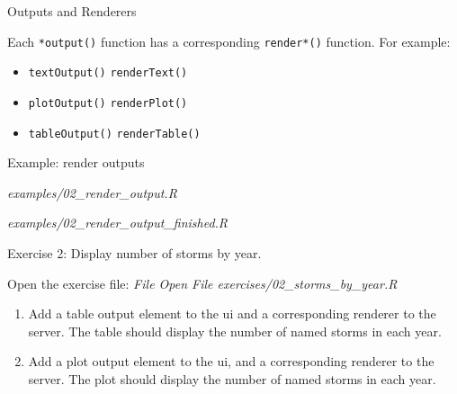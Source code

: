\documentclass[
  12pt,
  ignorenonframetext,
]{beamer}
\providecommand{\tightlist}{%
  \setlength{\itemsep}{0pt}\setlength{\parskip}{0pt}}
\begin{document}
\begin{frame}[fragile]{Outputs and Renderers}
\protect\hypertarget{outputs-and-renderers-1}{}

Each \texttt{*output()} function has a corresponding \texttt{render*()}
function. For example:

\begin{itemize}[<+->]
\tightlist
\item
  \texttt{textOutput()} \rightarrow \texttt{renderText()}
\end{itemize}

\begin{itemize}[<+->]
\tightlist
\item
  \texttt{plotOutput()} \rightarrow \texttt{renderPlot()}
\end{itemize}

\begin{itemize}[<+->]
\tightlist
\item
  \texttt{tableOutput()} \rightarrow \texttt{renderTable()}
\end{itemize}

\end{frame}

\begin{frame}{Example: render outputs}
\protect\hypertarget{example-render-outputs}{}

\begin{description}
\tightlist
\item[Start]
\emph{examples/02\_render\_output.R}
\item[Finished]
\emph{examples/02\_render\_output\_finished.R}
\end{description}

\end{frame}

\begin{frame}{Exercise 2: Display number of storms by year.}
\protect\hypertarget{exercise-2-display-number-of-storms-by-year.}{}

Open the exercise file: \emph{File \rightarrow Open File
\rightarrow exercises/02\_storms\_by\_year.R}

\begin{enumerate}
\item
  Add a table output element to the ui and a corresponding renderer to
  the server. The table should display the number of named storms in
  each year.
\item
  Add a plot output element to the ui, and a corresponding renderer to
  the server. The plot should display the number of named storms in each
  year.
\end{enumerate}

\end{frame}
\end{document}
